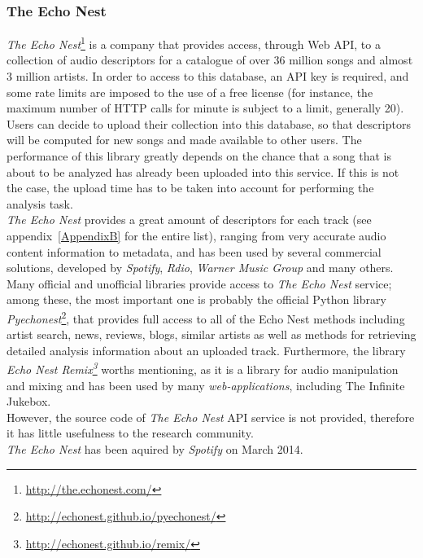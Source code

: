 \subsubsection*{The Echo Nest}
\textit{The Echo Nest}\footnote{\url{http://the.echonest.com/}} is a company that provides access, through Web API, to a collection of audio descriptors for a catalogue of over 36 million songs and almost 3 million artists. In order to access to this database, an API key is required, and some rate limits are imposed to the use of a free license (for instance, the maximum number of HTTP calls for minute is subject to a limit, generally 20). Users can decide to upload their collection into this database, so that descriptors will be computed for new songs and made available to other users. The performance of this library greatly depends on the chance that a song that is about to be analyzed has already been uploaded into this service. If this is not the case, the upload time has to be taken into account for performing the analysis task. \\ 
\textit{The Echo Nest} provides a great amount of descriptors for each track (see appendix~\ref{AppendixB} for the entire list), ranging from very accurate audio content information to metadata, and has been used by several commercial solutions, developed by \textit{Spotify}, \textit{Rdio}, \textit{Warner Music Group} and many others. Many official and unofficial libraries provide access to \textit{The Echo Nest} service; among these, the most important one is probably the official Python library \textit{Pyechonest}\footnote{\url{http://echonest.github.io/pyechonest/}}, that provides full access to all of the Echo Nest methods including artist search, news, reviews, blogs, similar artists as well as methods for retrieving detailed analysis information about an uploaded track. Furthermore, the library \textit{Echo Nest Remix\footnote{\url{http://echonest.github.io/remix/}}} worths mentioning, as it is a library for audio manipulation and mixing and has been used by many \textit{web-applications}, including The Infinite Jukebox. \\
However, the source code of \textit{The Echo Nest} API service is not provided, therefore it has little usefulness to the research community. \\ \textit{The Echo Nest} has been aquired by \textit{Spotify} on March 2014.


